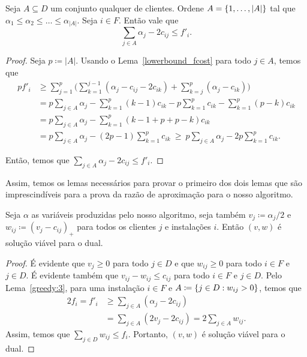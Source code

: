 \begin{lemma}
\label{greedy:3}
Seja $A \subseteq D$ um conjunto qualquer de clientes. Ordene $A = \{1,\ldots,|A|\}$ tal que $\alpha_1 \leq \alpha_2 \leq \ldots \leq \alpha_{|A|}$. Seja $i \in F$. Então vale que
\[ \sum_{j \in A}\alpha_j - 2c_{ij} \leq f'_i.
\]
\end{lemma}
\begin{proof}
Seja $p \coloneqq |A|$. Usando o Lema~\ref{lowerbound_fcost} para todo $j \in A$, temos que
\begin{subequations}
\begin{align*}
  p f'_i &\geq \sum_{j=1}^p {\big (} \sum_{k=1}^{j-1} (\alpha_j - c_{ij} - 2c_{ik}) + \sum_{k=j}^p (\alpha_j - c_{ik}) {\big )} \\
  &= p\sum_{j \in A}\alpha_j - \sum_{k=1}^p (k-1)c_{ik} - p\sum_{k=1}^p c_{ik} - \sum_{k=1}^p (p-k) c_{ik} \\
  &= p\sum_{j \in A}\alpha_j - \sum_{k=1}^p (k-1+p+p-k)c_{ik} \\
  &= p\sum_{j \in A}\alpha_j - (2p -1 )\sum_{k=1}^p c_{ik} \ \geq \ p\sum_{j \in A}\alpha_j - 2p\sum_{k=1}^p c_{ik}.
\end{align*}
\end{subequations}

Então, temos que $\sum_{j \in A}\alpha_j - 2c_{ij} \leq f'_i$.

\end{proof}

Assim, temos os lemas necessários para provar o primeiro dos dois lemas que são imprescindíveis para a prova da razão de aproximação para o nosso algoritmo.

\begin{lemma}
\label{greedy:4}
Seja $\alpha$ as variáveis produzidas pelo nosso algoritmo, seja também $v_j \coloneqq \alpha_j/2$ e $w_{ij} \coloneqq (v_j - c_{ij})_+$ para todos os clientes $j$ e instalações $i$. Então $(v,w)$ é solução viável para o dual. 
\end{lemma}

\begin{proof}
É evidente que $v_j \geq 0$ para todo $j \in D$ e que $w_{ij} \geq 0$ para todo $i \in F$ e $j \in D$. É evidente também que $v_{ij} - w_{ij} \leq c_{ij}$ para todo $i \in F$ e $j \in D$. Pelo Lema~\ref{greedy:3}, para uma instalação $i\in F$ e $A \coloneqq \{j \in D: w_{ij} > 0\}$, temos que
\begin{subequations}
\begin{align*}
2 f_i = f'_i &\geq \sum_{j \in A} (\alpha_j - 2c_{ij}) \\
 &= \sum_{j \in A}(2v_j - 2c_{ij}) = 2 \sum_{j \in A} w_{ij}.
\end{align*}
\end{subequations}
Assim, temos que $\sum_{j \in D} w_{ij} \leq f_i$. Portanto, $(v,w)$ é solução viável para o dual.
\end{proof}


